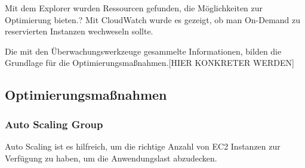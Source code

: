 
Mit dem Explorer wurden Ressourcen gefunden, die Möglichkeiten zur Optimierung bieten.?
Mit CloudWatch wurde es gezeigt, ob man On-Demand zu reservierten Instanzen wechweseln sollte.

Die mit den Überwachungswerkzeuge gesammelte Informationen, bilden die Grundlage für die Optimierungsmaßnahmen.[HIER KONKRETER WERDEN]

\subsection{Optimierungsmaßnahmen}

\subsubsection{Auto Scaling Group }
Auto Scaling ist es hilfreich, um die richtige Anzahl von EC2 Instanzen zur Verfügung zu haben, um die Anwendungslast abzudecken.
\\\\

